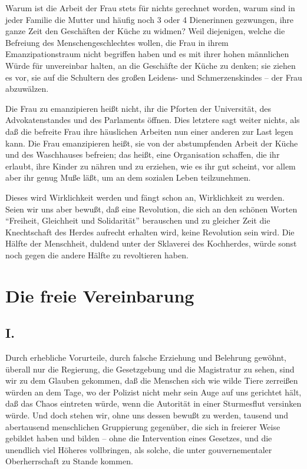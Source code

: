 \documentclass{scrbook}
\begin{document}
Warum ist die Arbeit der Frau stets für nichts gerechnet worden, warum sind in jeder Familie die Mutter und häufig noch 3 oder 4 Dienerinnen gezwungen, ihre ganze Zeit den Geschäften der Küche zu widmen? Weil diejenigen, welche die Befreiung des Menschengeschlechtes wollen, die Frau in ihrem Emanzipationstraum nicht begriffen haben und es mit ihrer hohen männlichen Würde für unvereinbar halten, an die Geschäfte der Küche zu denken; sie ziehen es vor, sie auf die Schultern des großen Leidens- und Schmerzenskindes – der Frau abzuwälzen.

Die Frau zu emanzipieren heißt nicht, ihr die Pforten der Universität, des Advokatenstandes und des Parlaments öffnen. Dies letztere sagt weiter nichts, als daß die befreite Frau ihre häuslichen Arbeiten nun einer anderen zur Last legen kann. Die Frau emanzipieren heißt, sie von der abstumpfenden Arbeit der Küche und des Waschhauses befreien; das heißt, eine Organisation schaffen, die ihr erlaubt, ihre Kinder zu nähren und zu erziehen, wie es ihr gut scheint, vor allem aber ihr genug Muße läßt, um an dem sozialen Leben teilzunehmen.

Dieses wird Wirklichkeit werden und fängt schon an, Wirklichkeit zu werden. Seien wir uns aber bewußt, daß eine Revolution, die sich an den schönen Worten ``Freiheit, Gleichheit und Solidarität'' berauschen und zu gleicher Zeit die Knechtschaft des Herdes aufrecht erhalten wird, keine Revolution sein wird. Die Hälfte der Menschheit, duldend unter der Sklaverei des Kochherdes, würde sonst noch gegen die andere Hälfte zu revoltieren haben.

\chapter{Die freie Vereinbarung}
\section*{I.}

Durch erhebliche Vorurteile, durch falsche Erziehung und Belehrung gewöhnt, überall nur die Regierung, die Gesetzgebung und die Magistratur zu sehen, sind wir zu dem Glauben gekommen, daß die Menschen sich wie wilde Tiere zerreißen würden an dem Tage, wo der Polizist nicht mehr sein Auge auf uns gerichtet hält, daß das Chaos eintreten würde, wenn die Autorität in einer Sturmesflut versinken würde. Und doch stehen wir, ohne uns dessen bewußt zu werden, tausend und abertausend menschlichen Gruppierung gegenüber, die sich in freierer Weise gebildet haben und bilden – ohne die Intervention eines Gesetzes, und die unendlich viel Höheres vollbringen, als solche, die unter gouvernementaler Oberherrschaft zu Stande kommen.
\end{document}
